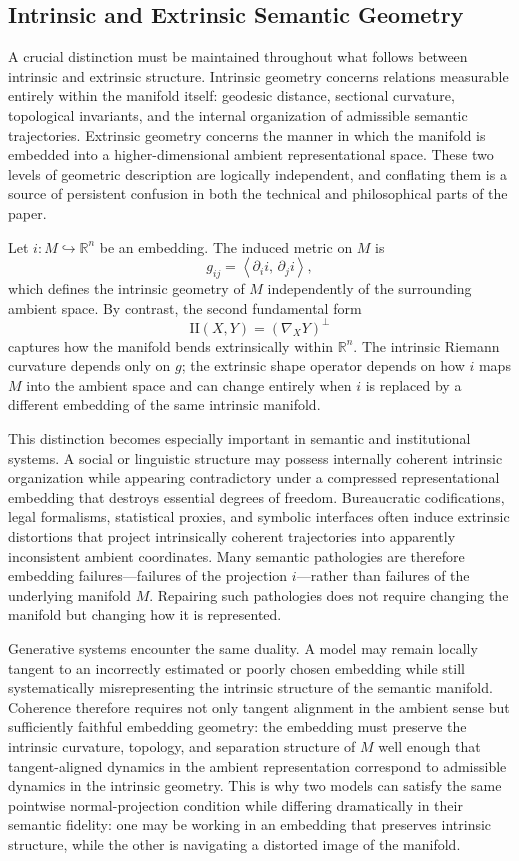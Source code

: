 \documentclass[11pt,a4paper,twocolumn]{article}
\begin{document}
\subsection{Intrinsic and Extrinsic Semantic Geometry}

A crucial distinction must be maintained throughout what follows
between intrinsic and extrinsic structure. Intrinsic geometry
concerns relations measurable entirely within the manifold itself:
geodesic distance, sectional curvature, topological invariants, and
the internal organization of admissible semantic trajectories.
Extrinsic geometry concerns the manner in which the manifold is
embedded into a higher-dimensional ambient representational space.
These two levels of geometric description are logically independent,
and conflating them is a source of persistent confusion in both the
technical and philosophical parts of the paper.

Let $i : M \hookrightarrow \mathbb{R}^n$ be an embedding. The
induced metric on $M$ is
\[
g_{ij} = \left\langle \partial_i i,\, \partial_j i \right\rangle,
\]
which defines the intrinsic geometry of $M$ independently of the
surrounding ambient space. By contrast, the second fundamental form
\[
\mathrm{II}(X,Y) = (\nabla_X Y)^\perp
\]
captures how the manifold bends extrinsically within $\mathbb{R}^n$.
The intrinsic Riemann curvature depends only on $g$; the extrinsic
shape operator depends on how $i$ maps $M$ into the ambient space
and can change entirely when $i$ is replaced by a different embedding
of the same intrinsic manifold.

This distinction becomes especially important in semantic and
institutional systems. A social or linguistic structure may possess
internally coherent intrinsic organization while appearing
contradictory under a compressed representational embedding that
destroys essential degrees of freedom. Bureaucratic codifications,
legal formalisms, statistical proxies, and symbolic interfaces often
induce extrinsic distortions that project intrinsically coherent
trajectories into apparently inconsistent ambient coordinates. Many
semantic pathologies are therefore embedding failures---failures of
the projection $i$---rather than failures of the underlying manifold
$M$. Repairing such pathologies does not require changing the
manifold but changing how it is represented.

Generative systems encounter the same duality. A model may remain
locally tangent to an incorrectly estimated or poorly chosen embedding
while still systematically misrepresenting the intrinsic structure of
the semantic manifold. Coherence therefore requires not only tangent
alignment in the ambient sense but sufficiently faithful embedding
geometry: the embedding must preserve the intrinsic curvature,
topology, and separation structure of $M$ well enough that
tangent-aligned dynamics in the ambient representation correspond to
admissible dynamics in the intrinsic geometry. This is why two
models can satisfy the same pointwise normal-projection condition
while differing dramatically in their semantic fidelity: one may be
working in an embedding that preserves intrinsic structure, while
the other is navigating a distorted image of the manifold.
\end{document}
